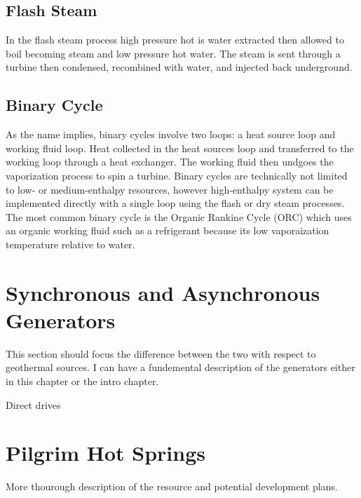 \subsection{Flash Steam} 
In the flash steam process high pressure hot is water extracted then allowed to boil becoming steam and low pressure hot water. The steam is sent through a turbine then condensed, recombined with water, and injected back underground.

\subsection{Binary Cycle} 
As the name implies, binary cycles involve two loops: a heat source loop and working fluid loop. Heat collected in the heat sources loop and transferred to the working loop through a heat exchanger. The working fluid then undgoes the vaporization process to spin a turbine. Binary cycles are technically not limited to low- or medium-enthalpy resources, however high-enthalpy system can be implemented directly with a single loop using the flash or dry steam processes. The most common binary cycle is the Organic Rankine Cycle (ORC) which uses an organic working fluid such as a refrigerant because its low vaporaization temperature relative to water.


\section{Synchronous and Asynchronous Generators}
This section should focus the difference between the two with respect to geothermal sources. I can have a fundemental description of the generators either in this chapter or the intro chapter.

Direct drives

\section{Pilgrim Hot Springs}
More thourough description of the resource and potential development plans.


